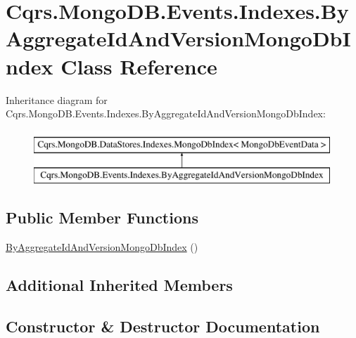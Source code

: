\hypertarget{classCqrs_1_1MongoDB_1_1Events_1_1Indexes_1_1ByAggregateIdAndVersionMongoDbIndex}{}\section{Cqrs.\+Mongo\+D\+B.\+Events.\+Indexes.\+By\+Aggregate\+Id\+And\+Version\+Mongo\+Db\+Index Class Reference}
\label{classCqrs_1_1MongoDB_1_1Events_1_1Indexes_1_1ByAggregateIdAndVersionMongoDbIndex}
Inheritance diagram for Cqrs.\+Mongo\+D\+B.\+Events.\+Indexes.\+By\+Aggregate\+Id\+And\+Version\+Mongo\+Db\+Index\+:\begin{figure}[H]
\begin{center}
\leavevmode
\includegraphics[height=2.000000cm]{classCqrs_1_1MongoDB_1_1Events_1_1Indexes_1_1ByAggregateIdAndVersionMongoDbIndex}
\end{center}
\end{figure}
\subsection*{Public Member Functions}
\begin{DoxyCompactItemize}
\item 
\hyperlink{classCqrs_1_1MongoDB_1_1Events_1_1Indexes_1_1ByAggregateIdAndVersionMongoDbIndex_a084cc895e473e0e0ea2dbcf81bba4514}{By\+Aggregate\+Id\+And\+Version\+Mongo\+Db\+Index} ()
\end{DoxyCompactItemize}
\subsection*{Additional Inherited Members}


\subsection{Constructor \& Destructor Documentation}
\mbox{\label{classCqrs_1_1MongoDB_1_1Events_1_1Indexes_1_1ByAggregateIdAndVersionMongoDbIndex_a084cc895e473e0e0ea2dbcf81bba4514}} 
